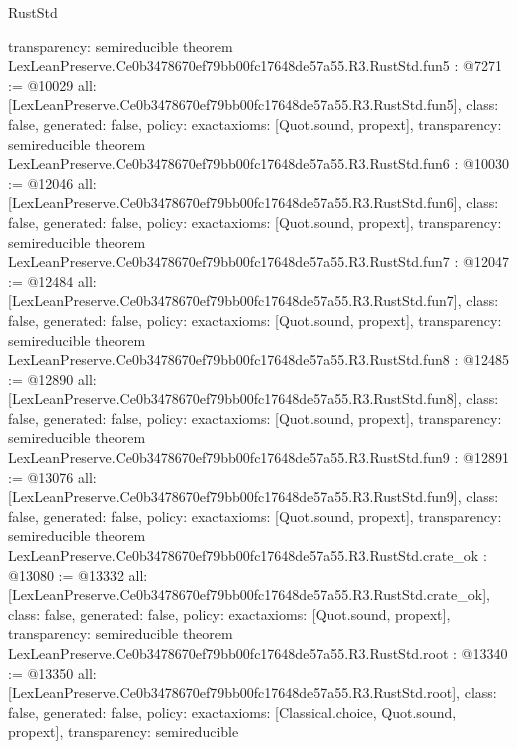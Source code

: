 \begin{lexlean}{RustStd}
\begin{coremodule}
{  transparency: semireducible
}
theorem LexLeanPreserve.Ce0b3478670ef79bb00fc17648de57a55.R3.RustStd.fun5 : @7271 := @10029 {
  all: [LexLeanPreserve.Ce0b3478670ef79bb00fc17648de57a55.R3.RustStd.fun5],
  class: false,
  generated: false,
  policy: exact{axioms: [Quot.sound, propext]},
  transparency: semireducible
}
theorem LexLeanPreserve.Ce0b3478670ef79bb00fc17648de57a55.R3.RustStd.fun6 : @10030 := @12046 {
  all: [LexLeanPreserve.Ce0b3478670ef79bb00fc17648de57a55.R3.RustStd.fun6],
  class: false,
  generated: false,
  policy: exact{axioms: [Quot.sound, propext]},
  transparency: semireducible
}
theorem LexLeanPreserve.Ce0b3478670ef79bb00fc17648de57a55.R3.RustStd.fun7 : @12047 := @12484 {
  all: [LexLeanPreserve.Ce0b3478670ef79bb00fc17648de57a55.R3.RustStd.fun7],
  class: false,
  generated: false,
  policy: exact{axioms: [Quot.sound, propext]},
  transparency: semireducible
}
theorem LexLeanPreserve.Ce0b3478670ef79bb00fc17648de57a55.R3.RustStd.fun8 : @12485 := @12890 {
  all: [LexLeanPreserve.Ce0b3478670ef79bb00fc17648de57a55.R3.RustStd.fun8],
  class: false,
  generated: false,
  policy: exact{axioms: [Quot.sound, propext]},
  transparency: semireducible
}
theorem LexLeanPreserve.Ce0b3478670ef79bb00fc17648de57a55.R3.RustStd.fun9 : @12891 := @13076 {
  all: [LexLeanPreserve.Ce0b3478670ef79bb00fc17648de57a55.R3.RustStd.fun9],
  class: false,
  generated: false,
  policy: exact{axioms: [Quot.sound, propext]},
  transparency: semireducible
}
theorem LexLeanPreserve.Ce0b3478670ef79bb00fc17648de57a55.R3.RustStd.crate_ok : @13080 := @13332 {
  all: [LexLeanPreserve.Ce0b3478670ef79bb00fc17648de57a55.R3.RustStd.crate_ok],
  class: false,
  generated: false,
  policy: exact{axioms: [Quot.sound, propext]},
  transparency: semireducible
}
theorem LexLeanPreserve.Ce0b3478670ef79bb00fc17648de57a55.R3.RustStd.root : @13340 := @13350 {
  all: [LexLeanPreserve.Ce0b3478670ef79bb00fc17648de57a55.R3.RustStd.root],
  class: false,
  generated: false,
  policy: exact{axioms: [Classical.choice, Quot.sound, propext]},
  transparency: semireducible
}


\end{coremodule}
\end{lexlean}
